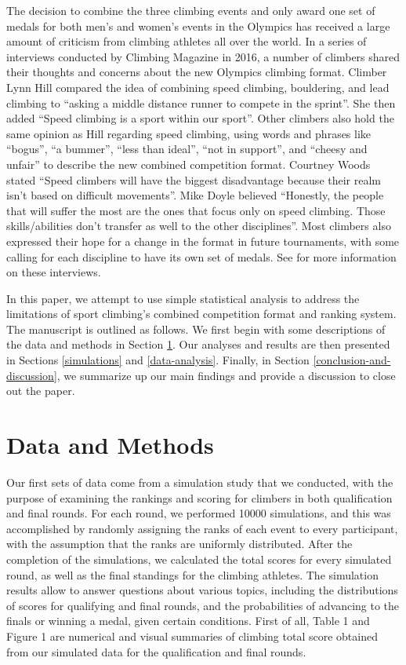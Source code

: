 \documentclass[12pt]{article}
\begin{document}
The decision to combine the three climbing events and only award one set
of medals for both men's and women's events in the Olympics has received
a large amount of criticism from climbing athletes all over the world.
In a series of interviews conducted by Climbing Magazine in 2016, a
number of climbers shared their thoughts and concerns about the new
Olympics climbing format. Climber Lynn Hill compared the idea of
combining speed climbing, bouldering, and lead climbing to ``asking a
middle distance runner to compete in the sprint''. She then added
``Speed climbing is a sport within our sport''. Other climbers also hold
the same opinion as Hill regarding speed climbing, using words and
phrases like ``bogus'', ``a bummer'', ``less than ideal'', ``not in
support'', and ``cheesy and unfair'' to describe the new combined
competition format. Courtney Woods stated ``Speed climbers will have the
biggest disadvantage because their realm isn't based on difficult
movements''. Mike Doyle believed ``Honestly, the people that will suffer
the most are the ones that focus only on speed climbing. Those
skills/abilities don't transfer as well to the other disciplines''. Most
climbers also expressed their hope for a change in the format in future
tournaments, with some calling for each discipline to have its own set
of medals. See \citet{blanchard2016} for more information on these
interviews.

In this paper, we attempt to use simple statistical analysis to address
the limitations of sport climbing's combined competition format and
ranking system. The manuscript is outlined as follows. We first begin
with some descriptions of the data and methods in Section
\ref{data-and-methods}. Our analyses and results are then presented in
Sections \ref{simulations} and \ref{data-analysis}. Finally, in Section
\ref{conclusion-and-discussion}, we summarize up our main findings and
provide a discussion to close out the paper.

\hypertarget{data-and-methods}{%
\section{Data and Methods}\label{data-and-methods}}

Our first sets of data come from a simulation study that we conducted,
with the purpose of examining the rankings and scoring for climbers in
both qualification and final rounds. For each round, we performed 10000
simulations, and this was accomplished by randomly assigning the ranks
of each event to every participant, with the assumption that the ranks
are uniformly distributed. After the completion of the simulations, we
calculated the total scores for every simulated round, as well as the
final standings for the climbing athletes. The simulation results allow
to answer questions about various topics, including the distributions of
scores for qualifying and final rounds, and the probabilities of
advancing to the finals or winning a medal, given certain conditions.
First of all, Table 1 and Figure 1 are numerical and visual summaries of
climbing total score obtained from our simulated data for the
qualification and final rounds.
\end{document}
